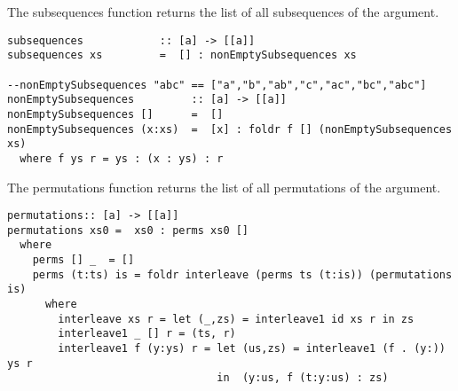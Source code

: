 The subsequences function returns the list of all subsequences of the argument.
\begin{lstlisting}[frame=single]
subsequences            :: [a] -> [[a]]
subsequences xs         =  [] : nonEmptySubsequences xs

--nonEmptySubsequences "abc" == ["a","b","ab","c","ac","bc","abc"]
nonEmptySubsequences         :: [a] -> [[a]]
nonEmptySubsequences []      =  []
nonEmptySubsequences (x:xs)  =  [x] : foldr f [] (nonEmptySubsequences xs)
  where f ys r = ys : (x : ys) : r
\end{lstlisting}

The permutations function returns the list of all permutations of the argument.
\begin{lstlisting}[frame=single]
permutations:: [a] -> [[a]]
permutations xs0 =  xs0 : perms xs0 []
  where
    perms [] _  = []
    perms (t:ts) is = foldr interleave (perms ts (t:is)) (permutations is)
      where 
        interleave xs r = let (_,zs) = interleave1 id xs r in zs
        interleave1 _ [] r = (ts, r)
        interleave1 f (y:ys) r = let (us,zs) = interleave1 (f . (y:)) ys r
                                 in  (y:us, f (t:y:us) : zs)
\end{lstlisting}